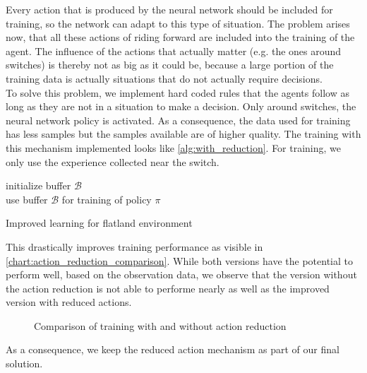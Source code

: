 Every action that is produced by the neural network should be included for training, so the network can adapt to this type of situation. The problem arises now, that all these actions of riding forward are included into the training of the agent. The influence of the actions that actually matter (e.g. the ones around switches) is thereby not as big as it could be, because a large portion of the training data is actually situations that do not actually require decisions.\\
To solve this problem, we implement hard coded rules that the agents follow as long as they are not in a situation to make a decision. Only around switches, the neural network policy is activated. As a consequence, the data used for training has less samples but the samples available are of higher quality. The training with this mechanism implemented looks like \autoref{alg:with_reduction}.
For training, we only use the experience collected near the switch.\\
\begin{algorithm}[H]
	initialize buffer $\mathcal{B}$\\
	use buffer $\mathcal{B}$ for training of policy $\pi$

	\caption{Improved learning for flatland environment}
	\label{alg:with_reduction}
\end{algorithm}
This drastically improves training performance as visible in \autoref{chart:action_reduction_comparison}. While both versions have the potential to perform well, based on the observation data, we observe that the version without the action reduction is not able to performe nearly as well as the improved version with reduced actions.
\begin{figure}[H]
	\begin{center}
		
	\end{center}
	\caption{Comparison of training with and without action reduction}
	\label{chart:action_reduction_comparison}
\end{figure}
As a consequence, we keep the reduced action mechanism as part of our final solution.
